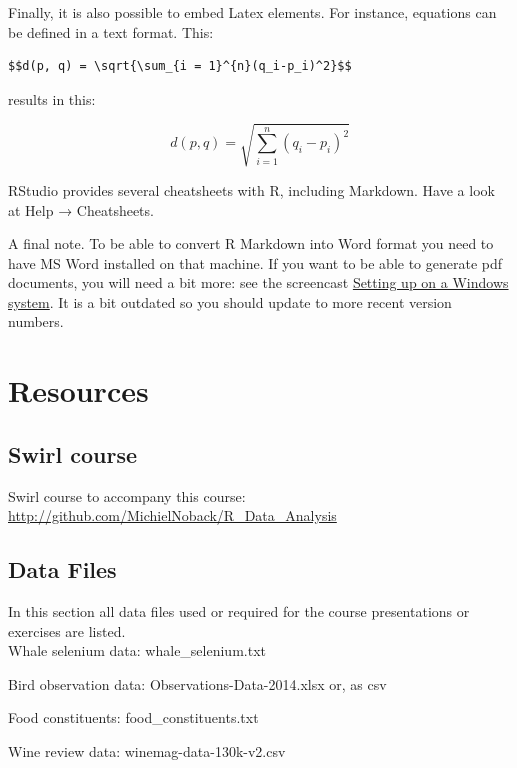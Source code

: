\documentclass[]{book}
\begin{document}
Finally, it is also possible to embed Latex elements. For instance, equations can be defined in a text format. This:

\begin{verbatim}
$$d(p, q) = \sqrt{\sum_{i = 1}^{n}(q_i-p_i)^2}$$
\end{verbatim}

results in this:

\[d(p, q) = \sqrt{\sum_{i = 1}^{n}(q_i-p_i)^2}\]

RStudio provides several cheatsheets with R, including Markdown. Have a look at Help → Cheatsheets.

A final note. To be able to convert R Markdown into Word format you need to have MS Word installed on that machine. If you want to be able to generate pdf documents, you will need a bit more: see the screencast \href{https://www.youtube.com/watch?v=YL3avjNu6Ak}{Setting up on a Windows system}. It is a bit outdated so you should update to more recent version numbers.

\hypertarget{resources}{%
\section{Resources}\label{resources}}

\hypertarget{swirl-course}{%
\subsection*{Swirl course}\label{swirl-course}}

Swirl course to accompany this course: \url{http://github.com/MichielNoback/R_Data_Analysis}

\hypertarget{data-files}{%
\subsection*{Data Files}\label{data-files}}

In this section all data files used or required for the course presentations or exercises are listed.\\

Whale selenium data:
whale\_selenium.txt

Bird observation data:
Observations-Data-2014.xlsx or, as
csv

Food constituents:
food\_constituents.txt

Wine review data:
winemag-data-130k-v2.csv
\end{document}
